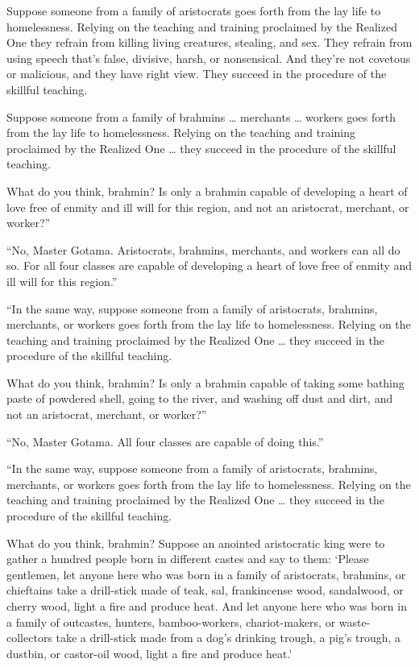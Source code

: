 \documentclass[12pt,openany]{book}%
\begin{document}
Suppose someone from a family of aristocrats goes forth from the lay life to homelessness. Relying on the teaching and training proclaimed by the Realized One they refrain from killing living creatures, stealing, and sex. They refrain from using speech that’s false, divisive, harsh, or nonsensical. And they’re not covetous or malicious, and they have right view. They succeed in the procedure of the skillful teaching. 

Suppose someone from a family of brahmins … merchants … workers goes forth from the lay life to homelessness. Relying on the teaching and training proclaimed by the Realized One … they succeed in the procedure of the skillful teaching. 

What do you think, brahmin? Is only a brahmin capable of developing a heart of love free of enmity and ill will for this region, and not an aristocrat, merchant, or worker?” 

“No, Master Gotama. Aristocrats, brahmins, merchants, and workers can all do so. For all four classes are capable of developing a heart of love free of enmity and ill will for this region.” 

“In the same way, suppose someone from a family of aristocrats, brahmins, merchants, or workers goes forth from the lay life to homelessness. Relying on the teaching and training proclaimed by the Realized One … they succeed in the procedure of the skillful teaching. 

What do you think, brahmin? Is only a brahmin capable of taking some bathing paste of powdered shell, going to the river, and washing off dust and dirt, and not an aristocrat, merchant, or worker?” 

“No, Master Gotama. All four classes are capable of doing this.” 

“In the same way, suppose someone from a family of aristocrats, brahmins, merchants, or workers goes forth from the lay life to homelessness. Relying on the teaching and training proclaimed by the Realized One … they succeed in the procedure of the skillful teaching. 

What do you think, brahmin? Suppose an anointed aristocratic king were to gather a hundred people born in different castes and say to them: ‘Please gentlemen, let anyone here who was born in a family of aristocrats, brahmins, or chieftains take a drill-stick made of teak, sal, frankincense wood, sandalwood, or cherry wood, light a fire and produce heat. And let anyone here who was born in a family of outcastes, hunters, bamboo-workers, chariot-makers, or waste-collectors take a drill-stick made from a dog’s drinking trough, a pig’s trough, a dustbin, or castor-oil wood, light a fire and produce heat.’ 
\end{document}

